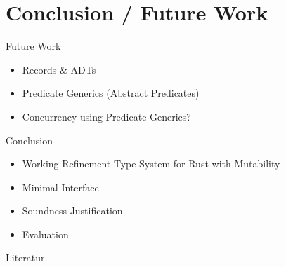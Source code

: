 \documentclass{sdqbeamer}
\begin{document}
\section{Conclusion / Future Work}


\begin{frame}{Future Work}
  \begin{itemize}
    \item Records \& ADTs 
    \item Predicate Generics (Abstract Predicates)
    \item Concurrency using Predicate Generics?
  \end{itemize}
\end{frame}

\begin{frame}{Conclusion}
  \begin{itemize}
    \item Working Refinement Type System for Rust with Mutability
    \item Minimal Interface
    \item Soundness Justification
    \item Evaluation
  \end{itemize}
\end{frame}



\appendix
\beginbackup

\begin{frame}{Literatur}
  \footnotesize{
    \printbibliography
  }
\end{frame}
\end{document}
